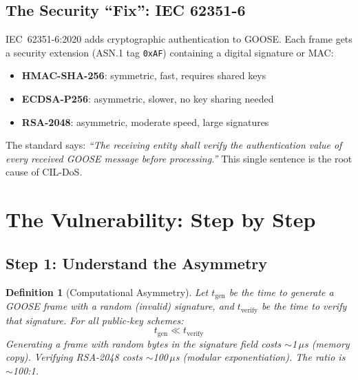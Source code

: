 \documentclass[11pt,a4paper,twocolumn]{article}
\newtheorem{definition}{Definition}
\begin{document}
\subsection{The Security ``Fix'': IEC 62351-6}

IEC~62351-6:2020 adds cryptographic authentication to GOOSE. Each frame gets a security extension (ASN.1 tag \texttt{0xAF}) containing a digital signature or MAC:

\begin{itemize}[leftmargin=1.5em,itemsep=1pt]
\item \textbf{HMAC-SHA-256}: symmetric, fast, requires shared keys
\item \textbf{ECDSA-P256}: asymmetric, slower, no key sharing needed
\item \textbf{RSA-2048}: asymmetric, moderate speed, large signatures
\end{itemize}

\begin{attackbox}
The standard says: \emph{``The receiving entity shall verify the authentication value of every received GOOSE message before processing.''} This single sentence is the root cause of CIL-DoS.
\end{attackbox}

\section{The Vulnerability: Step by Step}
\label{sec:vulnerability}

\subsection{Step 1: Understand the Asymmetry}

\begin{definition}[Computational Asymmetry]
Let $t_{\text{gen}}$ be the time to \emph{generate} a GOOSE frame with a random (invalid) signature, and $t_{\text{verify}}$ be the time to \emph{verify} that signature. For all public-key schemes:
\begin{equation}
t_{\text{gen}} \ll t_{\text{verify}}
\end{equation}
Generating a frame with random bytes in the signature field costs $\sim$1\,$\mu$s (memory copy). Verifying RSA-2048 costs $\sim$100\,$\mu$s (modular exponentiation). The ratio is $\sim$100:1.
\end{definition}
\end{document}
